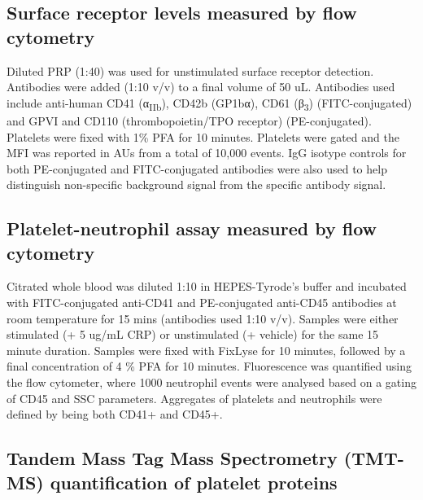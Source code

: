 \documentclass[11pt,twoside]{bristolthesis}
\begin{document}
\hypertarget{surface-receptor-levels-measured-by-flow-cytometry}{%
\subsection{Surface receptor levels measured by flow cytometry}\label{surface-receptor-levels-measured-by-flow-cytometry}}

Diluted PRP (1:40) was used for unstimulated surface receptor detection. Antibodies were added (1:10 v/v) to a final volume of 50 uL. Antibodies used include anti-human CD41 (α\textsubscript{IIb}), CD42b (GP1bα), CD61 (β\textsubscript{3}) (FITC-conjugated) and GPVI and CD110 (thrombopoietin/TPO receptor) (PE-conjugated). Platelets were fixed with 1\% PFA for 10 minutes. Platelets were gated and the MFI was reported in AUs from a total of 10,000 events. IgG isotype controls for both PE-conjugated and FITC-conjugated antibodies were also used to help distinguish non-specific background signal from the specific antibody signal.

\hypertarget{platelet-neutrophil-assay-measured-by-flow-cytometry}{%
\subsection{Platelet-neutrophil assay measured by flow cytometry}\label{platelet-neutrophil-assay-measured-by-flow-cytometry}}

Citrated whole blood was diluted 1:10 in HEPES-Tyrode's buffer and incubated with FITC-conjugated anti-CD41 and PE-conjugated anti-CD45 antibodies at room temperature for 15 mins (antibodies used 1:10 v/v). Samples were either stimulated (+ 5 ug/mL CRP) or unstimulated (+ vehicle) for the same 15 minute duration. Samples were fixed with FixLyse for 10 minutes, followed by a final concentration of 4 \% PFA for 10 minutes. Fluorescence was quantified using the flow cytometer, where 1000 neutrophil events were analysed based on a gating of CD45 and SSC parameters. Aggregates of platelets and neutrophils were defined by being both CD41+ and CD45+.

\hypertarget{tandem-mass-tag-mass-spectrometry-tmt-ms-quantification-of-platelet-proteins}{%
\subsection{Tandem Mass Tag Mass Spectrometry (TMT-MS) quantification of platelet proteins}\label{tandem-mass-tag-mass-spectrometry-tmt-ms-quantification-of-platelet-proteins}}
\end{document}
